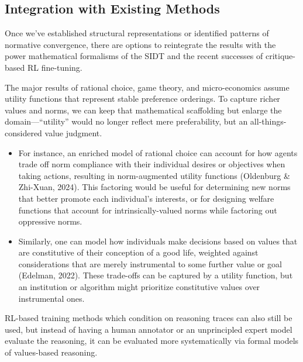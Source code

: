 \subsection{Integration with Existing Methods}

Once we've established structural representations or identified patterns of normative convergence, there are options to reintegrate the results with the power mathematical formalisms of the SIDT and the recent successes of critique-based RL fine-tuning.

The major results of rational choice, game theory, and micro-economics assume utility functions that represent stable preference orderings. To capture richer values and norms, we can keep that mathematical scaffolding but enlarge the domain—``utility'' would no longer reflect mere preferability, but an all-things-considered value judgment.

\begin{itemize}
\item For instance, an enriched model of rational choice can account for how agents trade off norm compliance with their individual desires or objectives when taking actions, resulting in norm-augmented utility functions (Oldenburg \& Zhi-Xuan, 2024). This factoring would be useful for determining new norms that better promote each individual's interests, or for designing welfare functions that account for intrinsically-valued norms while factoring out oppressive norms.

\item Similarly, one can model how individuals make decisions based on values that are constitutive of their conception of a good life, weighted against considerations that are merely instrumental to some further value or goal (Edelman, 2022). These trade-offs can be captured by a utility function, but an institution or algorithm might prioritize constitutive values over instrumental ones.
\end{itemize}

RL-based training methods which condition on reasoning traces can also still be used, but instead of having a human annotator or an unprincipled expert model evaluate the reasoning, it can be evaluated more systematically via formal models of values-based reasoning.